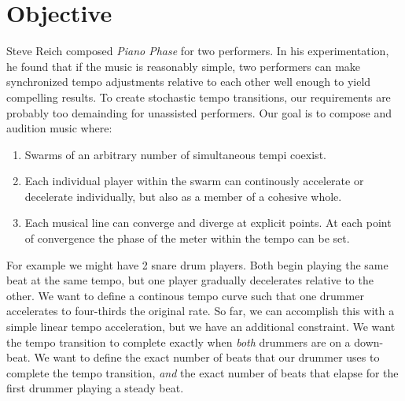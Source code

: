 \section{Objective}
\label{sec:polytempic-objective}
Steve Reich composed \textit{Piano Phase} for two performers. In his
experimentation, he found that if the music is reasonably simple, two
performers can make synchronized tempo adjustments relative to each
other well enough to yield compelling results. To create stochastic
tempo transitions, our requirements are probably too demainding for
unassisted performers. Our goal is to compose and audition music
where:
\begin{enumerate}
  \item Swarms of an arbitrary number of simultaneous tempi
    coexist. 
  \item Each individual player within the swarm can continously
    accelerate or decelerate individually, but also as a member of a
    cohesive whole. 
  \item Each musical line can converge and diverge at explicit
    points. At each point of convergence the phase of the meter within
    the tempo can be set.
\end{enumerate}
For example we might have 2 snare drum players. Both begin playing the
same beat at the same tempo, but one player gradually decelerates
relative to the other. We want to define a continous tempo curve such
that one drummer accelerates to four-thirds the original rate. So far,
we can accomplish this with a simple linear tempo acceleration, but we
have an additional constraint. We want the tempo transition to
complete exactly when \emph{both} drummers are on a down-beat. We want
to define the exact number of beats that our drummer uses to complete
the tempo transition, \emph{and} the exact number of beats that elapse
for the first drummer playing a steady beat.

